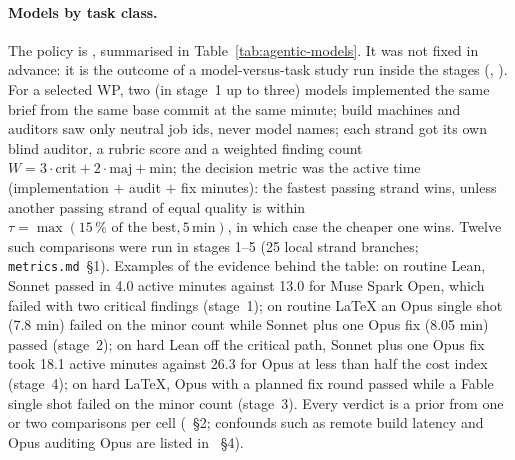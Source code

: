 \begin{sloppypar}
\paragraph{Models by task class.} The policy is , summarised in
Table~\ref{tab:agentic-models}. It was not fixed in advance: it is the outcome of a model-versus-task study run inside
the stages (, ).
For a selected WP, two (in stage~1 up to three) models implemented the same brief from the same base commit at the
same minute; build machines and auditors saw only neutral job ids, never model names; each strand got its own blind
auditor, a rubric score and a weighted finding count $W = 3\cdot\mathrm{crit} + 2\cdot\mathrm{maj} + \mathrm{min}$;
the decision metric was the active time (implementation $+$ audit $+$ fix minutes): the fastest passing strand wins,
unless another passing strand of equal quality is within $\tau = \max(15\,\%\mbox{ of the best}, 5\,\mathrm{min})$,
in which case the cheaper one wins. Twelve such comparisons were run in stages 1--5
(25 local strand branches; \texttt{metrics.md}~\S1). Examples of the evidence behind the table: on routine Lean,
Sonnet passed in 4.0 active minutes against 13.0 for Muse Spark Open, which failed with two critical findings
(stage~1); on routine LaTeX an Opus single shot (7.8 min) failed on the minor count while Sonnet plus one Opus fix
(8.05 min) passed (stage~2); on hard Lean off the critical path, Sonnet plus one Opus fix took 18.1 active minutes
against 26.3 for Opus at less than half the cost index (stage~4); on hard LaTeX, Opus with a planned fix round
passed while a Fable single shot failed on the minor count (stage~3). Every verdict is a prior from one or two
comparisons per cell (~\S2; confounds such as remote build latency and Opus auditing
Opus are listed in ~\S4).
\end{sloppypar}

